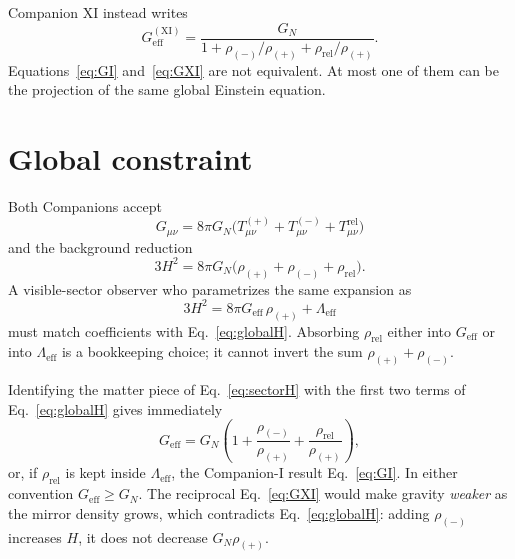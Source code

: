 \documentclass[11pt,a4paper]{article}
\begin{document}
Companion XI instead writes
\begin{equation}
  G_{\mathrm{eff}}^{\mathrm{(XI)}}
  =
  \frac{G_N}{
    1
    +
    \rho_{(-)}/\rho_{(+)}
    +
    \rho_{\mathrm{rel}}/\rho_{(+)}
  }.
  \label{eq:GXI}
\end{equation}
Equations~\eqref{eq:GI} and~\eqref{eq:GXI} are not equivalent. At most one
of them can be the projection of the same global Einstein equation.

\section{Global constraint}

Both Companions accept
\begin{equation}
  G_{\mu\nu}
  =
  8\pi G_N
  \bigl(
    T^{(+)}_{\mu\nu}
    +
    T^{(-)}_{\mu\nu}
    +
    T^{\mathrm{rel}}_{\mu\nu}
  \bigr)
\end{equation}
and the background reduction
\begin{equation}
  3H^2
  =
  8\pi G_N
  \bigl(
    \rho_{(+)}
    +
    \rho_{(-)}
    +
    \rho_{\mathrm{rel}}
  \bigr).
  \label{eq:globalH}
\end{equation}
A visible-sector observer who parametrizes the same expansion as
\begin{equation}
  3H^2
  =
  8\pi G_{\mathrm{eff}}\, \rho_{(+)}
  +
  \Lambda_{\mathrm{eff}}
  \label{eq:sectorH}
\end{equation}
must match coefficients with Eq.~\eqref{eq:globalH}. Absorbing
\(\rho_{\mathrm{rel}}\) either into \(G_{\mathrm{eff}}\) or into
\(\Lambda_{\mathrm{eff}}\) is a bookkeeping choice; it cannot invert the
sum \(\rho_{(+)}+\rho_{(-)}\).

Identifying the matter piece of Eq.~\eqref{eq:sectorH} with the first two
terms of Eq.~\eqref{eq:globalH} gives immediately
\begin{equation}
  G_{\mathrm{eff}}
  =
  G_N
  \left(
    1
    +
    \frac{\rho_{(-)}}{\rho_{(+)}}
    +
    \frac{\rho_{\mathrm{rel}}}{\rho_{(+)}}
  \right),
  \label{eq:Gfinal}
\end{equation}
or, if \(\rho_{\mathrm{rel}}\) is kept inside \(\Lambda_{\mathrm{eff}}\),
the Companion-I result Eq.~\eqref{eq:GI}. In either convention
\(G_{\mathrm{eff}}\ge G_N\). The reciprocal Eq.~\eqref{eq:GXI} would make
gravity \emph{weaker} as the mirror density grows, which contradicts
Eq.~\eqref{eq:globalH}: adding \(\rho_{(-)}\) increases \(H\), it does not
decrease \(G_N\rho_{(+)}\).
\end{document}
